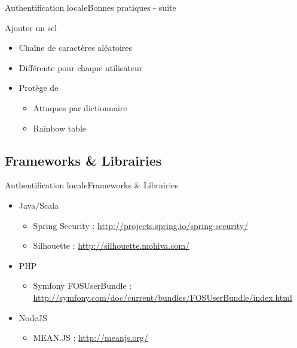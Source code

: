 \documentclass{beamer}
\begin{document}
\begin{frame}{Authentification locale}{Bonnes pratiques - suite}
  \begin{center}
    \begin{block}{Ajouter un sel}
      \begin{itemize}
        \item Chaîne de caractères aléatoires
        \item Différente pour chaque utilisateur
        \item Protège de
          \begin{itemize}
            \item Attaques par dictionnaire
            \item Rainbow table
          \end{itemize}
      \end{itemize}
    \end{block}
  \end{center}
\end{frame}

\subsection{Frameworks \& Librairies}

\begin{frame}{Authentification locale}{Frameworks \& Librairies}
  \begin{center}
    \begin{itemize}
      \item Java/Scala
      \begin{itemize}
        \item Spring Security : \href{url}{http://projects.spring.io/spring-security/}
        \item Silhouette : \href{url}{http://silhouette.mohiva.com/}
      \end{itemize}
      \item PHP
      \begin{itemize}
        \item Symfony FOSUserBundle : \href{url}{http://symfony.com/doc/current/bundles/FOSUserBundle/index.html}
      \end{itemize}
      \item NodeJS
      \begin{itemize}
        \item MEAN.JS : \href{url}{http://meanjs.org/}
      \end{itemize}
    \end{itemize}
  \end{center}
\end{frame}
\end{document}
